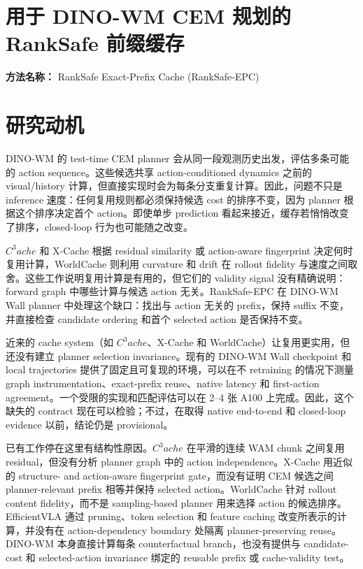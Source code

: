 \documentclass[10pt,a4paper]{article}
\begin{document}
\section*{用于 DINO-WM CEM 规划的 RankSafe 前缀缓存}
\textbf{方法名称：} RankSafe Exact-Prefix Cache (RankSafe-EPC)
\section*{研究动机}
DINO-WM 的 test-time CEM planner 会从同一段观测历史出发，评估多条可能的 action sequence。这些候选共享 action-conditioned dynamics 之前的 visual/history 计算，但直接实现时会为每条分支重复计算。因此，问题不只是 inference 速度：任何复用规则都必须保持候选 cost 的排序不变，因为 planner 根据这个排序决定首个 action。即使单步 prediction 看起来接近，缓存若悄悄改变了排序，closed-loop 行为也可能随之改变。

\(C^{3}ache\) 和 X-Cache 根据 residual similarity 或 action-aware fingerprint 决定何时复用计算，WorldCache 则利用 curvature 和 drift 在 rollout fidelity 与速度之间取舍。这些工作说明复用计算是有用的，但它们的 validity signal 没有精确说明：forward graph 中哪些计算与候选 action 无关。RankSafe-EPC 在 DINO-WM Wall planner 中处理这个缺口：找出与 action 无关的 prefix，保持 suffix 不变，并直接检查 candidate ordering 和首个 selected action 是否保持不变。

近来的 cache system（如 \(C^{3}ache\)、X-Cache 和 WorldCache）让复用更实用，但还没有建立 planner selection invariance。现有的 DINO-WM Wall checkpoint 和 local trajectories 提供了固定且可复现的环境，可以在不 retraining 的情况下测量 graph instrumentation、exact-prefix reuse、native latency 和 first-action agreement。一个受限的实现和匹配评估可以在 2--4 张 A100 上完成。因此，这个缺失的 contract 现在可以检验；不过，在取得 native end-to-end 和 closed-loop evidence 以前，结论仍是 provisional。

已有工作停在这里有结构性原因。\(C^{3}ache\) 在平滑的连续 WAM chunk 之间复用 residual，但没有分析 planner graph 中的 action independence。X-Cache 用近似的 structure- and action-aware fingerprint gate，而没有证明 CEM 候选之间 planner-relevant prefix 相等并保持 selected action。WorldCache 针对 rollout content fidelity，而不是 sampling-based planner 用来选择 action 的候选排序。EfficientVLA 通过 pruning、token selection 和 feature caching 改变所表示的计算，并没有在 action-dependency boundary 处隔离 planner-preserving reuse。DINO-WM 本身直接计算每条 counterfactual branch，也没有提供与 candidate-cost 和 selected-action invariance 绑定的 reusable prefix 或 cache-validity test。
\end{document}
